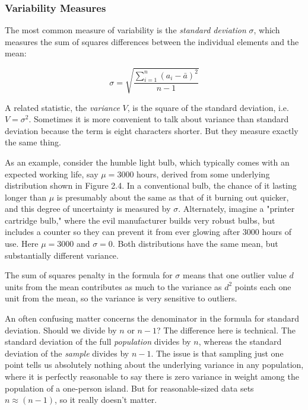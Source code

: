 \documentclass[10pt]{article}
\begin{document}
\subsubsection{Variability Measures}
The most common measure of variability is the \textit{standard deviation} \(\sigma\), which measures the sum of squares differences between the individual elements and the mean:

\[
\sigma = \sqrt{\frac{\sum_{i=1}^{n}\left(a_{i} - \bar{a}\right)^{2}}{n-1}}
\]

A related statistic, the \textit{variance} \(V\), is the square of the standard deviation, i.e. \(V=\sigma^{2}\). Sometimes it is more convenient to talk about variance than standard deviation because the term is eight characters shorter. But they measure exactly the same thing.

As an example, consider the humble light bulb, which typically comes with an expected working life, say \(\mu=3000\) hours, derived from some underlying distribution shown in Figure 2.4. In a conventional bulb, the chance of it lasting longer than \(\mu\) is presumably about the same as that of it burning out quicker, and this degree of uncertainty is measured by \(\sigma\). Alternately, imagine a "printer cartridge bulb," where the evil manufacturer builds very robust bulbs, but includes a counter so they can prevent it from ever glowing after 3000 hours of use. Here \(\mu=3000\) and \(\sigma=0\). Both distributions have the same mean, but substantially different variance.

The sum of squares penalty in the formula for \(\sigma\) means that one outlier value \(d\) units from the mean contributes as much to the variance as \(d^{2}\) points each one unit from the mean, so the variance is very sensitive to outliers.

An often confusing matter concerns the denominator in the formula for standard deviation. Should we divide by \(n\) or \(n-1\)? The difference here is technical. The standard deviation of the full \textit{population} divides by \(n\), whereas the standard deviation of the \textit{sample} divides by \(n-1\). The issue is that sampling just one point tells us absolutely nothing about the underlying variance in any population, where it is perfectly reasonable to say there is zero variance in weight among the population of a one-person island. But for reasonable-sized data sets \(n \approx (n-1)\), so it really doesn't matter.
\end{document}
